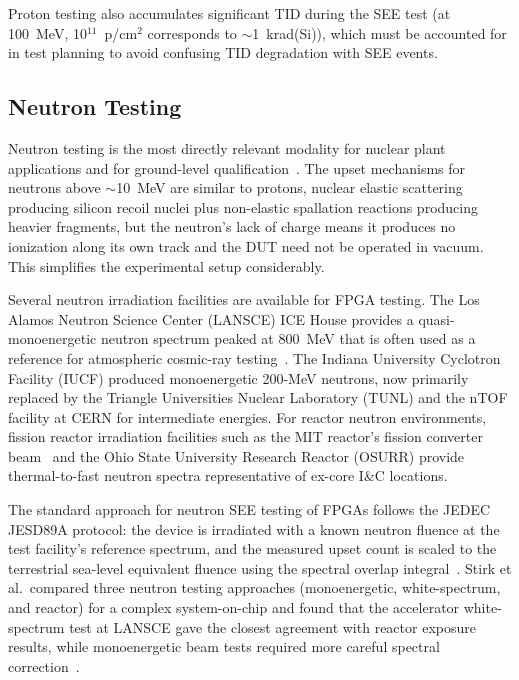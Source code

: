 Proton testing also accumulates significant TID during the SEE
test (at 100~MeV, 10$^{11}$~p/cm$^2$ corresponds to
$\sim$1~krad(Si)), which must be accounted for in test planning
to avoid confusing TID degradation with SEE events.

\subsection{Neutron Testing}

Neutron testing is the most directly relevant modality for
nuclear plant applications and for ground-level
qualification~\cite{stirk2023comparison}.  The upset mechanisms
for neutrons above $\sim$10~MeV are similar to protons,
nuclear elastic scattering producing silicon recoil nuclei
plus non-elastic spallation reactions producing heavier
fragments, but the neutron's lack of charge means it produces
no ionization along its own track and the DUT need not be
operated in vacuum.  This simplifies the experimental
setup considerably.

Several neutron irradiation facilities are available for
FPGA testing.  The Los Alamos Neutron Science Center (LANSCE)
ICE House provides a quasi-monoenergetic neutron spectrum
peaked at 800~MeV that is often used as a reference for
atmospheric cosmic-ray testing~\cite{wirthlin2016leon3}.  The
Indiana University Cyclotron Facility (IUCF) produced
monoenergetic 200-MeV neutrons, now primarily replaced by
the Triangle Universities Nuclear Laboratory (TUNL) and the
nTOF facility at CERN for intermediate energies.  For reactor
neutron environments, fission reactor irradiation facilities
such as the MIT reactor's fission converter
beam~\cite{harling2006fission} and the
Ohio State University Research Reactor (OSURR) provide
thermal-to-fast neutron spectra representative of ex-core
I\&C locations.

The standard approach for neutron SEE testing of FPGAs follows
the JEDEC JESD89A protocol: the device is irradiated with a
known neutron fluence at the test facility's reference spectrum,
and the measured upset count is scaled to the terrestrial
sea-level equivalent fluence using the spectral overlap
integral~\cite{jedec2006jesd89a}.  Stirk et al.\
compared three neutron testing approaches (monoenergetic,
white-spectrum, and reactor) for a complex system-on-chip
and found that the accelerator white-spectrum test at LANSCE
gave the closest agreement with reactor exposure results,
while monoenergetic beam tests required more careful spectral
correction~\cite{stirk2023comparison}.

